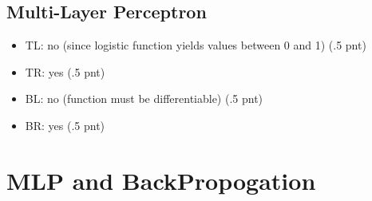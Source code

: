 \documentclass[12pt]{article}
\providecommand{\tightlist}{%
	\setlength{\itemsep}{0pt}\setlength{\parskip}{0pt}}
\begin{document}
\subsection{Multi-Layer Perceptron}

\begin{itemize}
	\tightlist
	\item  TL: no (since logistic function yields values between 0 and 1) (.5 pnt)
	\item TR: yes (.5 pnt)
	\item  BL: no (function must be differentiable) (.5 pnt)
	\item  BR: yes (.5 pnt)
\end{itemize}

\newpage
\section{MLP and BackPropogation} \label{sec:3}
\end{document}
